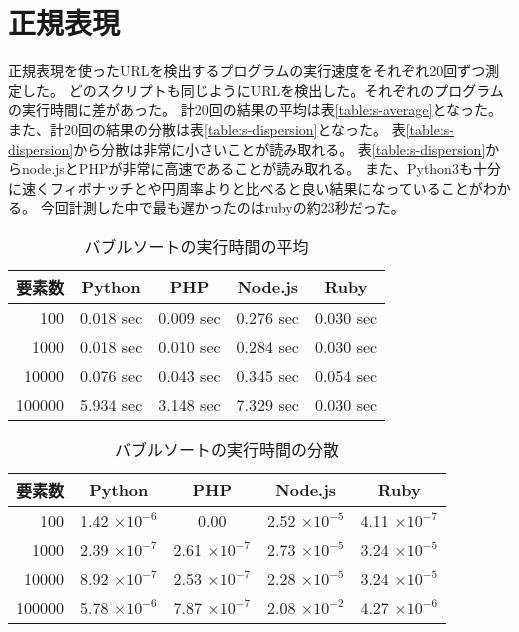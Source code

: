 \section{正規表現}
正規表現を使ったURLを検出するプログラムの実行速度をそれぞれ20回ずつ測定した。
どのスクリプトも同じようにURLを検出した。それぞれのプログラムの実行時間に差があった。
計20回の結果の平均は表\ref{table:s-average}となった。
また、計20回の結果の分散は表\ref{table:s-dispersion}となった。
表\ref{table:s-dispersion}から分散は非常に小さいことが読み取れる。
表\ref{table:s-dispersion}からnode.jsとPHPが非常に高速であることが読み取れる。
また、Python3も十分に速くフィボナッチとや円周率よりと比べると良い結果になっていることがわかる。
今回計測した中で最も遅かったのはrubyの約23秒だった。

\begin{table}[tb]
\centering
\begin{tabular}{|r||c|c|c|c|}
\hline
要素数 & Python & PHP & Node.js & Ruby \\ \hline \hline
100	    & 0.018 sec & 0.009 sec	& 0.276	sec & 0.030 sec \\ \hline
1000	& 0.018 sec	& 0.010 sec	& 0.284	sec & 0.030 sec \\ \hline
10000	& 0.076 sec	& 0.043 sec	& 0.345	sec & 0.054 sec \\ \hline
100000	& 5.934 sec	& 3.148	sec & 7.329	sec & 0.030 sec \\ \hline
\end{tabular}
\caption{バブルソートの実行時間の平均}
\label{table:b-average}
\end{table}

\begin{table}[tb]
\centering
\begin{tabular}{|r||c|c|c|c|}
\hline
要素数 & Python & PHP & Node.js & Ruby \\ \hline \hline
100     & 1.42 $\times 10^{-6}$ & 0.00                  & 2.52 $\times 10^{-5}$	& 4.11 $\times 10^{-7}$ \\ \hline
1000	& 2.39 $\times 10^{-7}$ & 2.61 $\times 10^{-7}$ & 2.73 $\times 10^{-5}$	& 3.24 $\times 10^{-5}$ \\ \hline
10000	& 8.92 $\times 10^{-7}$ & 2.53 $\times 10^{-7}$ & 2.28 $\times 10^{-5}$ & 3.24 $\times 10^{-5}$ \\ \hline
100000	& 5.78 $\times 10^{-6}$ & 7.87 $\times 10^{-7}$ & 2.08 $\times 10^{-2}$ & 4.27 $\times 10^{-6}$ \\ \hline
\end{tabular}
\caption{バブルソートの実行時間の分散}
\label{table:b-dispersion}
\end{table}


